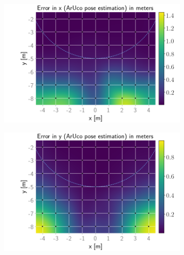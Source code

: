 \documentclass[../Head/report.tex]{subfiles}
\begin{document}
\begin{figure}[H]
    \centering
    \begin{subfigure}[t]{.337\textwidth}
        \centering
        \includegraphics[width=\textwidth]{../Figures/GPS2Vision_pose_estimation_test/test1_aruco_board_width_0.2_space_0.1/aruco_pose_estimation_error_x.png}
        \caption{}
        \label{fig:GPS2Vision_pose_estimation_test1_error_x}
    \end{subfigure}
    \hspace{-0.9em}
    \begin{subfigure}[t]{.337\textwidth}
        \centering
        \includegraphics[width=\textwidth]{../Figures/GPS2Vision_pose_estimation_test/test1_aruco_board_width_0.2_space_0.1/aruco_pose_estimation_error_y.png}
        \caption{}
        \label{fig:GPS2Vision_pose_estimation_test1_error_y}
    \end{subfigure}

\end{figure}
\end{document}
